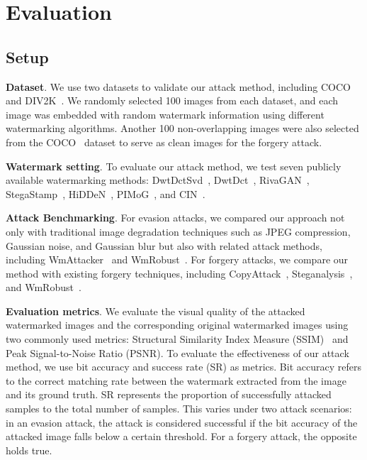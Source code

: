 \section{Evaluation}
\subsection{Setup}
\textbf{Dataset}. We use two datasets to validate our attack method, including COCO~\cite{MS-COCO} and DIV2K~\cite{Agustsson_2017_CVPR_Workshops}. We randomly selected 100 images from each dataset, and each image was embedded with random watermark information using different watermarking algorithms. Another 100 non-overlapping images were also selected from the COCO~\cite{MS-COCO} dataset to serve as clean images for the forgery attack.

\textbf{Watermark setting}. To evaluate our attack method, we test seven publicly available watermarking methods: DwtDctSvd~\cite{DWT-DCT-SVD}, DwtDct~\cite{DWT-DCT}, RivaGAN~\cite{RivaGAN}, StegaStamp~\cite{stegastamp}, HiDDeN~\cite{zhu2018hidden}, PIMoG~\cite{PIMoG}, and CIN~\cite{CIN}. %


\textbf{Attack Benchmarking}. 
For evasion attacks, we compared our approach not only with traditional image degradation techniques such as JPEG compression, Gaussian noise, and Gaussian blur but also with related attack methods, including WmAttacker~\cite{zhao2023invisible} and WmRobust~\cite{saberi2023robustness}. For forgery attacks, we compare our method with existing forgery techniques, including CopyAttack~\cite{kutter2000watermark}, Steganalysis~\cite{yang2024steganalysis}, and WmRobust~\cite{saberi2023robustness}.


\textbf{Evaluation metrics}. We evaluate the visual quality of the attacked watermarked images and the corresponding original watermarked images using two commonly used metrics: Structural Similarity Index Measure (SSIM)~\cite{wang2004image} and Peak Signal-to-Noise Ratio (PSNR). To evaluate the effectiveness of our attack method, we use bit accuracy and success rate (SR) as metrics. Bit accuracy refers to the correct matching rate between the watermark extracted from the image and its ground truth. SR represents the proportion of successfully attacked samples to the total number of samples. This varies under two attack scenarios: in an evasion attack, the attack is considered successful if the bit accuracy of the attacked image falls below a certain threshold. For a forgery attack, the opposite holds true.

